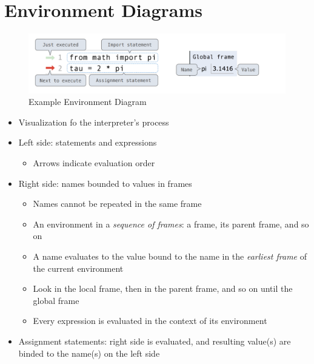 \section{Environment Diagrams}
\medskip
\begin{figure}[H]
  \includegraphics[width=1\linewidth]{figures/environment_diagram.png}
  \caption{Example Environment Diagram}
\end{figure}
\begin{itemize}
	\item Visualization fo the interpreter's process
	\item Left side: statements and expressions
	\begin{itemize}
		\item Arrows indicate evaluation order
	\end{itemize}
	\item Right side: names bounded to values in frames
	\begin{itemize}
		\item Names cannot be repeated in the same frame
		\item An environment in a \emph{sequence of frames}: a frame, its parent frame, and so on
		\item A name evaluates to the value bound to the name in the \emph{earliest frame} of the current environment
		\item Look in the local frame, then in the parent frame, and so on until the global frame
		\item Every expression is evaluated in the context of its environment
	\end{itemize}
	\item Assignment statements: right side is evaluated, and resulting value(s) are binded to the name(s) on the left side
\end{itemize}

